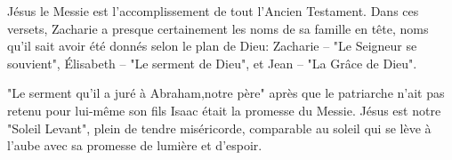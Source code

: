 Jésus le Messie est l'accomplissement de tout l'Ancien Testament. Dans ces versets, Zacharie a presque certainement les noms de sa famille en tête, noms qu'il sait avoir été donnés selon le plan de Dieu: Zacharie – "Le Seigneur se souvient", Élisabeth – "Le serment de Dieu", et Jean – "La Grâce de Dieu".

"Le serment qu’il a juré à Abraham,notre père" après que le patriarche n'ait pas retenu pour lui-même son fils Isaac était la promesse du Messie. Jésus est notre "Soleil Levant", plein de tendre miséricorde, comparable au soleil qui se lève à l'aube avec sa promesse de lumière et d'espoir.

        
